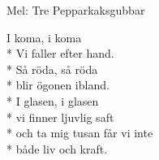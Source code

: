\begin{SongText}[I koma]
    \begin{SongInfo}
        Mel: Tre Pepparkaksgubbar
    \end{SongInfo}
    \begin{SongVerse}
        I koma, i koma\\*%
        Vi faller efter hand.\\*%
        Så röda, så röda\\*%
        blir ögonen ibland.\\*%
        I glasen, i glasen\\*%
        vi finner ljuvlig saft\\*%
        och ta mig tusan får vi inte\\*%
        både liv och kraft.
    \end{SongVerse}
\end{SongText}
